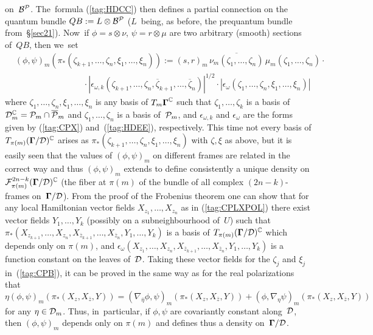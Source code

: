 \documentclass[11pt]{amsart}
\numberwithin{equation}{section}
\theoremstyle{remark}
\newcommand\Omg{{\bigam}}   %
\newcommand\FF{\Cal F}
\newcommand\PP{{\Cal P}}
\newcommand\DD{{\Cal D}}
\newcommand\MD{{\Omg/\DD}}
\newcommand\BB{\Cal B}
\newcommand{\CC}{\C}
\newcommand{\bigam}{\mbox{\boldmath $\Gamma$}}
\newcommand{\C}{\mathbb C}
\begin{document}
on~$\BB^\PP$. The~formula (\ref{tag:HDCC}) then defines a partial connection on
the quantum bundle $QB:=L\otimes\BB^\PP$ ($L$~being, as before, the prequantum
bundle from~\S\ref{sec21}). Now~if $\phi=s\otimes\nu$, $\psi=r\otimes\mu$ are
two arbitrary (smooth) sections of~$QB$, then we~set
\begin{equation}  \begin{aligned}
& (\phi,\psi)_m (\pi_*(\zeta_{k+1},\dots,\zeta_n,\xi_1,\dots,\xi_n)) :=
(s,r)_m\,\overline{\nu_m(\zeta_1,\dots,\zeta_n)}\,\mu_m(\zeta_1,\dots,\zeta_n)
\cdot{} \\ & \qquad\qquad\qquad\qquad {} \cdot
|\epsilon_{\omega,k}(\zeta_{k+1},\dots,\zeta_n,\overline\zeta_{k+1},\dots,
\overline\zeta_n)|^{1/2} \cdot |\epsilon_\omega(\zeta_1,\dots,\zeta_n,\xi_1,
\dots,\xi_n)|  \end{aligned}   \label{tag:CPB}  \end{equation}
where $\zeta_1,\dots,\zeta_n,\xi_1,\dots,\xi_n$ is any basis of $T_m\Omg^\CC$
such that $\zeta_1,\dots,\zeta_k$ is a basis of $\DD_m^\CC=\PP_m\cap\overline
\PP_m$ and $\zeta_1,\dots,\zeta_n$ is a basis of~$\PP_m$, and $\epsilon_
{\omega,k}$ and $\epsilon_\omega$ are the forms given by (\ref{tag:CPX})
and~(\ref{tag:HDEE}), respectively. This time not every basis of $T_{\pi(m)}
(\MD)^\CC$ arises as $\pi_*(\zeta_{k+1},\dots,\zeta_n,\xi_1,\dots,\xi_n)$ with
$\zeta,\xi$ as above, but it is easily seen that the values of $(\phi,\psi)_m$
on different frames are related in the correct way and thus $(\phi,\psi)_m$
extends to define consistently a unique density on $\FF^{2n-k}_{\pi(m)}(\MD)^
\CC$ (the fiber at $\pi(m)$ of the bundle of all complex $(2n-k)$-frames
on~$\MD$). From the proof of the Frobenius theorem one can show that for any
local Hamiltonian vector fields $X_{z_1},\dots,X_{z_n}$ as in
(\ref{tag:CPLXPOL}) there exist vector fields $Y_1,\dots,Y_k$ (possibly on a
subneighbourhood of~$U$) such that
$\pi_*(X_{z_{k+1}},\dots,X_{z_n},X_{\overline z_{k+1}},\dots,X_{\overline z_n},
Y_1,\dots,Y_k)$ is a basis of $T_{\pi(m)}(\MD)^\CC$ which depends only on
$\pi(m)$, and $\epsilon_\omega(X_{z_1},\dots,X_{z_n},X_{\overline z_{k+1}},
\dots,X_{\overline z_n},Y_1,\dots,Y_k)$ is a function constant on the leaves
of~$\DD$. Taking these vector fields for the $\zeta_j$ and $\xi_j$
in~(\ref{tag:CPB}), it can be proved in the same way as for the real
polarizations that
$$ \eta(\phi,\psi)_m(\pi_*(X_z,X_{\overline z},Y)) =
(\nabla_{\overline\eta} \phi,\psi)_m(\pi_*(X_z,X_{\overline z},Y)) +
(\phi,\nabla_\eta \psi)_m (\pi_*(X_z,X_{\overline z},Y))  $$
for any $\eta\in\DD_m$. Thus, in~particular, if $\phi,\psi$ are covariantly
constant along~$\DD$, then $(\phi,\psi)_m$ depends only on $\pi(m)$ and defines
thus a density on~$\MD$.
\end{document}
